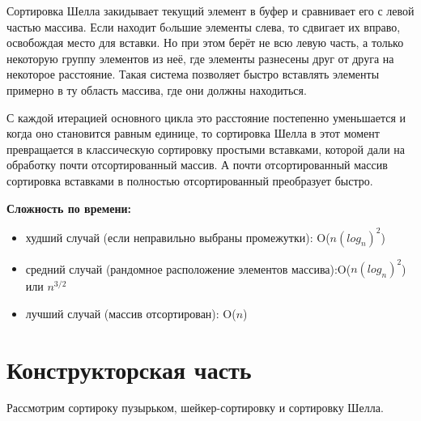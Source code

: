 \documentclass[a4paper]{article}
\begin{document}
	Сортировка Шелла закидывает текущий элемент в буфер и сравнивает его с левой частью массива. Если находит бoльшие элементы слева, то сдвигает их вправо, освобождая место для вставки. Но при этом берёт не всю левую часть, а только некоторую группу элементов из неё, где элементы разнесены друг от друга на некоторое расстояние. Такая система позволяет быстро вставлять элементы примерно в ту область массива, где они должны находиться.
	
	С каждой итерацией основного цикла это расстояние постепенно уменьшается и когда оно становится равным единице, то сортировка Шелла в этот момент превращается в классическую сортировку простыми вставками, которой дали на обработку почти отсортированный массив. А почти отсортированный массив сортировка вставками в полностью отсортированный преобразует быстро.
	\clearpage
	
	\textbf{Сложность по времени:}
	\begin{itemize}
		\item худший случай (если неправильно выбраны промежутки): O($n (log_{n})^{2}$) 
		\item средний случай (рандомное расположение элементов массива):O($n (log_{n})^{2}$) или $n^{3/2}$
		\item лучший случай (массив отсортирован): O($n$)
	\end{itemize}

	\section{Конструкторская часть}
	Рассмотрим сортироку пузырьком, шейкер-сортировку и сортировку Шелла.
	
\end{document}
